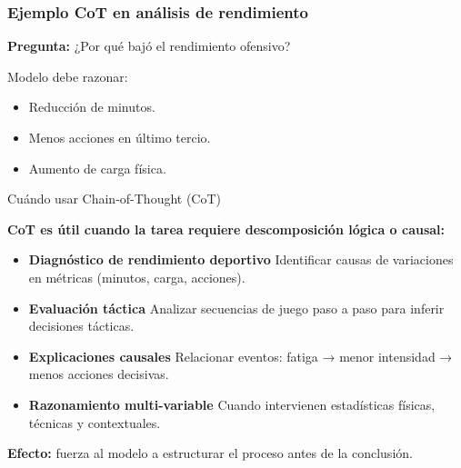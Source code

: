 \documentclass[aspectratio=169]{beamer}
\begin{document}
\begin{frame}\frametitle{Ejemplo CoT en análisis de rendimiento}
\textbf{Pregunta:} ¿Por qué bajó el rendimiento ofensivo?

Modelo debe razonar:
\begin{itemize}
    \item Reducción de minutos.
    \item Menos acciones en último tercio.
    \item Aumento de carga física.
\end{itemize}
\end{frame}

\begin{frame}{Cuándo usar Chain-of-Thought (CoT)}

\textbf{CoT es útil cuando la tarea requiere descomposición lógica o causal:}

\begin{itemize}
    \item \textbf{Diagnóstico de rendimiento deportivo}  
    Identificar causas de variaciones en métricas (minutos, carga, acciones).

    \item \textbf{Evaluación táctica}  
    Analizar secuencias de juego paso a paso para inferir decisiones tácticas.

    \item \textbf{Explicaciones causales}  
    Relacionar eventos: fatiga → menor intensidad → menos acciones decisivas.

    \item \textbf{Razonamiento multi-variable}  
    Cuando intervienen estadísticas físicas, técnicas y contextuales.
\end{itemize}

\textbf{Efecto:} fuerza al modelo a estructurar el proceso antes de la conclusión.
\end{frame}
\end{document}
